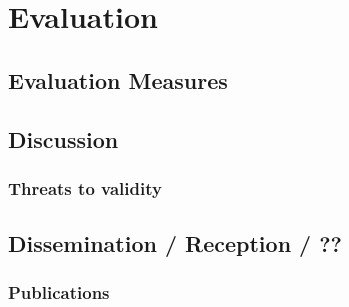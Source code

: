 
\chapter{Evaluation}
\label{Evaluation}


\section{Evaluation Measures}







\section{Discussion}

\subsection{Threats to validity}



\section{Dissemination / Reception / ??}

\subsection{Publications}

